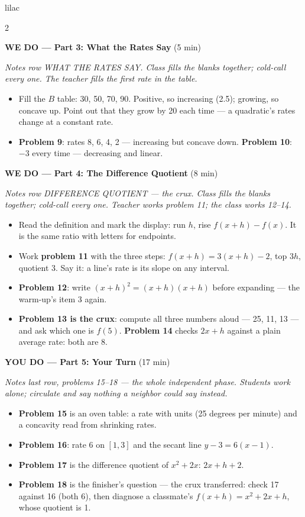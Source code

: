 \documentclass[10pt]{article}
\begin{document}
\begin{skillbox}{lilac}
\begin{multicols}{2}
\columnbreak

\textbf{WE DO --- Part 3: What the Rates Say} (5 min)

\textit{Notes row WHAT THE RATES SAY. Class fills the blanks together; cold-call every one.
The teacher fills the first rate in the table.}
\begin{itemize}
  \item Fill the $B$ table: 30, 50, 70, 90. Positive, so increasing (2.5); growing, so concave
        up. Point out that they grow by 20 each time --- a quadratic's rates change at a
        constant rate.
  \item \textbf{Problem 9}: rates 8, 6, 4, 2 --- increasing but concave down.
        \textbf{Problem 10}: $-3$ every time --- decreasing and linear.
\end{itemize}

\textbf{WE DO --- Part 4: The Difference Quotient} (8 min)

\textit{Notes row DIFFERENCE QUOTIENT --- the crux. Class fills the blanks together; cold-call
every one. Teacher works problem 11; the class works 12--14.}
\begin{itemize}
  \item Read the definition and mark the display: run $h$, rise $f(x + h) - f(x)$. It is the
        same ratio with letters for endpoints.
  \item Work \textbf{problem 11} with the three steps: $f(x + h) = 3(x + h) - 2$, top $3h$,
        quotient 3. Say it: a line's rate is its slope on any interval.
  \item \textbf{Problem 12}: write $(x + h)^2 = (x + h)(x + h)$ before expanding --- the warm-up's
        item 3 again.
  \item \textbf{Problem 13 is the crux}: compute all three numbers aloud --- 25, 11, 13 --- and
        ask which one is $f(5)$. \textbf{Problem 14} checks $2x + h$ against a plain average
        rate: both are 8.
\end{itemize}

\textbf{YOU DO --- Part 5: Your Turn} (17 min)

\textit{Notes last row, problems 15--18 --- the whole independent phase. Students work alone;
circulate and say nothing a neighbor could say instead.}
\begin{itemize}
  \item \textbf{Problem 15} is an oven table: a rate with units (25 degrees per minute) and a
        concavity read from shrinking rates.
  \item \textbf{Problem 16}: rate 6 on $[1, 3]$ and the secant line $y - 3 = 6(x - 1)$.
  \item \textbf{Problem 17} is the difference quotient of $x^2 + 2x$: $2x + h + 2$.
  \item \textbf{Problem 18} is the finisher's question --- the crux transferred: check 17
        against 16 (both 6), then diagnose a classmate's $f(x + h) = x^2 + 2x + h$, whose
        quotient is 1.
\end{itemize}
\end{multicols}
\end{skillbox}
\end{document}
